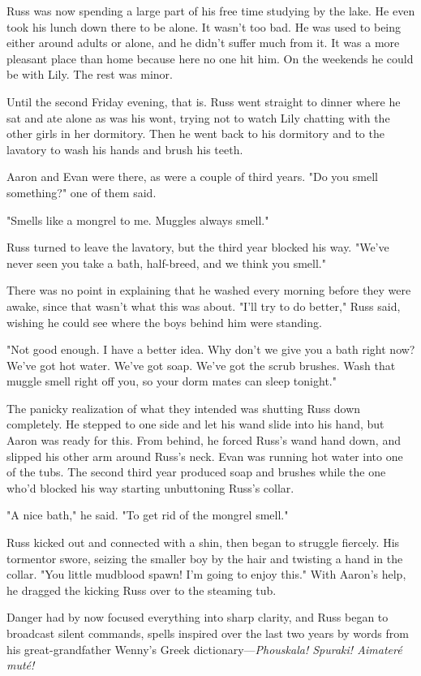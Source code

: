 Russ was now spending a large part of his free time studying by the lake. He even took his lunch down there to be alone. It wasn't too bad. He was used to being either around adults or alone, and he didn't suffer much from it. It was a more pleasant place than home because here no one hit him. On the weekends he could be with Lily. The rest was minor.

Until the second Friday evening, that is. Russ went straight to dinner where he sat and ate alone as was his wont, trying not to watch Lily chatting with the other girls in her dormitory. Then he went back to his dormitory and to the lavatory to wash his hands and brush his teeth.

Aaron and Evan were there, as were a couple of third years. "Do you smell something?" one of them said.

"Smells like a mongrel to me. Muggles always smell."

Russ turned to leave the lavatory, but the third year blocked his way. "We've never seen you take a bath, half-breed, and we think you smell."

There was no point in explaining that he washed every morning before they were awake, since that wasn't what this was about. "I'll try to do better," Russ said, wishing he could see where the boys behind him were standing.

"Not good enough. I have a better idea. Why don't we give you a bath right now? We've got hot water. We've got soap. We've got the scrub brushes. Wash that muggle smell right off you, so your dorm mates can sleep tonight."

The panicky realization of what they intended was shutting Russ down completely. He stepped to one side and let his wand slide into his hand, but Aaron was ready for this. From behind, he forced Russ's wand hand down, and slipped his other arm around Russ's neck. Evan was running hot water into one of the tubs. The second third year produced soap and brushes while the one who'd blocked his way starting unbuttoning Russ's collar.

"A nice bath," he said. "To get rid of the mongrel smell."

Russ kicked out and connected with a shin, then began to struggle fiercely. His tormentor swore, seizing the smaller boy by the hair and twisting a hand in the collar. "You little mudblood spawn! I'm going to enjoy this." With Aaron's help, he dragged the kicking Russ over to the steaming tub.

Danger had by now focused everything into sharp clarity, and Russ began to broadcast silent commands, spells inspired over the last two years by words from his great-grandfather Wenny's Greek dictionary—\emph{Phouskala! Spuraki! Aimateré muté!}

